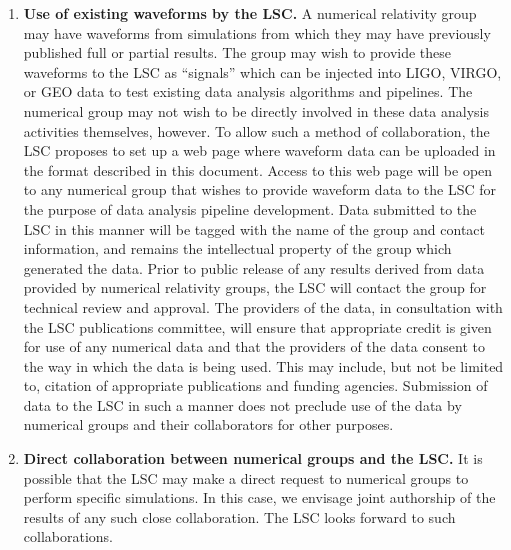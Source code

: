 \documentclass[10pt]{ligodcc}
\begin{document}
\begin{enumerate}
\item \textbf{Use of existing waveforms by the LSC.} A numerical relativity group may
have waveforms from simulations from which they may have previously published
full or partial results. The group may wish to provide these waveforms to the
LSC as ``signals'' which can be injected into LIGO, VIRGO, or GEO data to test
existing data analysis algorithms and pipelines.  The numerical group may not
wish to be directly involved in these data analysis activities themselves,
however. To allow such a method of collaboration, the LSC proposes to set up a
web page where waveform data can be uploaded in the format described in this
document. Access to this web page will be open to any numerical group that
wishes to provide waveform data to the LSC for the purpose of data analysis
pipeline development. Data submitted to the LSC in this manner will be tagged
with the name of the group and contact information, and remains the
intellectual property of the group which generated the data. Prior to public
release of any results derived from data provided by numerical relativity
groups, the LSC will contact the group for technical review and approval.  The
providers of the data, in consultation with the LSC publications committee,
will ensure that appropriate credit is given for use of any numerical data and
that the providers of the data consent to the way in which the data is being
used. This may include, but not be limited to, citation of appropriate
publications and funding agencies. Submission of data to the LSC in such a
manner does not preclude use of the data by numerical groups and their
collaborators for other purposes.

\item\textbf{Direct collaboration between numerical groups and the LSC.} It is
possible that the LSC may make a direct request to numerical groups to
perform specific simulations. In this case, we envisage joint authorship
of the results of any such close collaboration. The LSC looks forward to such
collaborations.

\end{enumerate}
\end{document}
